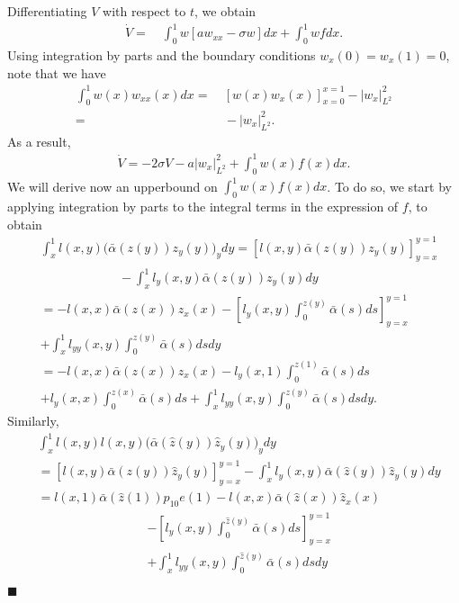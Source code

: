 \documentclass[twocolumn]{autart}
\newenvironment{proof}{{\it Proof. }}{\hfill $\blacksquare$ }
\begin{document}
\begin{proof}
Differentiating $V$ with respect to $t$, we obtain 
\begin{align}
\dot{V} =&~ \int_0^1 w\left[aw_{xx}-\sigma w\right]dx +\int_{0}^{1}wfdx. 
\end{align}
Using integration by parts and the boundary conditions $w_x(0)=w_x(1)=0$, note that we have 
\begin{align}
\int_{0}^{1}w(x)w_{xx}(x)dx =&~ \left[w(x)w_x(x)\right]_{x=0}^{x=1} -|w_x|_{L^2}^2 \nonumber \\
=&~-|w_x|_{L^2}^2.
\end{align}
As a result, 
\begin{align}
\dot{V} = - 2 \sigma V - a |w_x|_{L^2}^2+ \int_{0}^{1}w(x)f(x)dx. \label{diff_g}
\end{align}
We will derive now an upperbound on $\int_{0}^{1}w(x)f(x)dx$. To do so, we start by applying integration by parts to the integral terms in the expression of $f$, to obtain 
\begin{align*}
&\int_{x}^{1}l(x,y)\big(\bar{\alpha}(z(y))z_y(y)\big)_ydy = \left[l(x,y)\bar{\alpha}(z(y))z_y(y)\right]_{y=x}^{y=1} \nonumber \\
&~\qquad \qquad \qquad-\int_{x}^{1}l_y(x,y)\bar{\alpha}(z(y))z_y(y)dy \nonumber \\
&= - l(x,x)\bar{\alpha}(z(x))z_x(x) -\left[l_y(x,y)\int_{0}^{z(y)}\bar{\alpha}(s)ds\right]_{y=x}^{y=1} \nonumber \\
&+\int_{x}^{1}l_{yy}(x,y)\int_{0}^{z(y)}\bar{\alpha}(s)ds dy \\
&= - l(x,x)\bar{\alpha}(z(x))z_x(x) - l_y(x,1)\int_{0}^{z(1)}\bar{\alpha}(s)ds \nonumber \\
&+l_y(x,x)\int_{0}^{z(x)}\bar{\alpha}(s)ds+\int_{x}^{1}l_{yy}(x,y)\int_{0}^{z(y)}\bar{\alpha}(s)ds dy.
\end{align*}
Similarly, 
\begin{align*}
&\int_{x}^{1}l(x,y)l(x,y)\big(\bar{\alpha}(\hat{z}(y))\hat{z}_y(y)\big)_ydy \\
&= \left[l(x,y)\bar{\alpha}(z(y))\hat{z}_y(y)\right]_{y=x}^{y=1} -\int_{x}^{1}l_y(x,y)\bar{\alpha}(\hat{z}(y))\hat{z}_y(y)dy \nonumber \\
&= l(x,1)\bar{\alpha}(\hat{z}(1))p_{10}e(1)- l(x,x)\bar{\alpha}(\hat{z}(x))\hat{z}_x(x) \nonumber 
\end{align*}
\begin{align*}
&-\left[l_y(x,y)\int_{0}^{\hat{z}(y)}\bar{\alpha}(s)ds\right]_{y=x}^{y=1} \\
&+\int_{x}^{1}l_{yy}(x,y)\int_{0}^{\hat{z}(y)}\bar{\alpha}(s)ds dy \\

\end{align*}
\end{proof}
\end{document}
